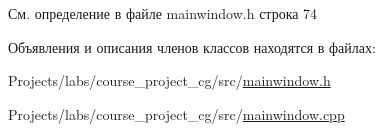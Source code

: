 См. определение в файле mainwindow.\+h строка 74



Объявления и описания членов классов находятся в файлах\+:\begin{DoxyCompactItemize}
\item 
Projects/labs/course\+\_\+project\+\_\+cg/src/\hyperlink{mainwindow_8h}{mainwindow.\+h}\item 
Projects/labs/course\+\_\+project\+\_\+cg/src/\hyperlink{mainwindow_8cpp}{mainwindow.\+cpp}\end{DoxyCompactItemize}
